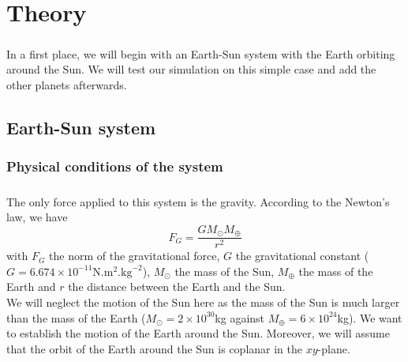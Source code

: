 \documentclass[a4paper, twoside, 11pt]{report}
\theoremstyle{theorem}
\theoremstyle{remark}
\theoremstyle{exemple}
\begin{document}
    \paragraph{}
    

\chapter{Theory}
    
    \paragraph{}In a first place, we will begin with an Earth-Sun system with the Earth orbiting around the Sun. We will test our simulation on this simple case and add the other planets afterwards. 

    \section{Earth-Sun system}
    
        \subsection{Physical conditions of the system}
        
            \paragraph{}The only force applied to this system is the gravity. According to the Newton's law, we have 
                \begin{equation}
                F_G = \frac{GM_{\odot}M_{\oplus}}{r^2}
                \end{equation}
            with $F_G$ the norm of the gravitational force, $G$ the gravitational constant ($G=6.674 \times 10^{-11} \mathrm{N}.\mathrm{m}^2.\mathrm{kg}^{-2}$), $M_{\odot}$ the mass of the Sun, $M_{\oplus}$ the mass of the Earth and $r$ the distance between the Earth and the Sun.\\
            We will neglect the motion of the Sun here as the mass of the Sun is much larger than the mass of the Earth ($M_{\odot} = 2 \times 10^{30}$kg against $M_{\oplus} = 6 \times 10^{24}$kg). We want to establish the motion of the Earth around the Sun. Moreover, we will assume that the orbit of the Earth around the Sun is coplanar in the $xy$-plane.
\end{document}
